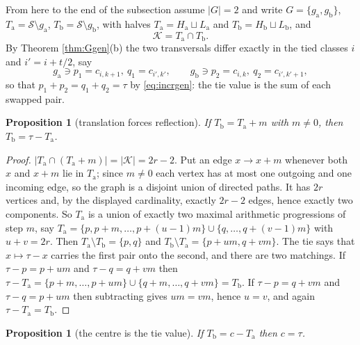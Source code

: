 \documentclass[11pt,reqno]{amsart}
\theoremstyle{plain}
\newtheorem{proposition}[theorem]{Proposition}
\theoremstyle{definition}
\begin{document}
From here to the end of the subsection assume $|G|=2$ and write $G=\{g_{\mathrm a},g_{\mathrm b}\}$,
$T_{\mathrm a}=\mathcal{S}\setminus g_{\mathrm a}$, $T_{\mathrm b}=\mathcal{S}\setminus g_{\mathrm b}$,
with halves $T_{\mathrm a}=H_{\mathrm a}\sqcup L_{\mathrm a}$ and
$T_{\mathrm b}=H_{\mathrm b}\sqcup L_{\mathrm b}$, and
\[
  \mathcal{K}=T_{\mathrm a}\cap T_{\mathrm b}.
\]
By Theorem \ref{thm:Ggen}(b) the two transversals differ exactly in the tied classes $i$ and
$i'=i+t/2$, say
\begin{equation}\label{eq:swapgen}
  g_{\mathrm a}\ni p_1=c_{i,k+1},\ q_1=c_{i',k'},\qquad
  g_{\mathrm b}\ni p_2=c_{i,k},\ q_2=c_{i',k'+1},
\end{equation}
so that $p_1+p_2=q_1+q_2=\tau$ by \eqref{eq:incrgen}: the tie value is the sum of each swapped pair.

\begin{proposition}[translation forces reflection]\label{prop:translgen}
If $T_{\mathrm b}=T_{\mathrm a}+m$ with $m\ne0$, then $T_{\mathrm b}=\tau-T_{\mathrm a}$.
\end{proposition}

\begin{proof}
$|T_{\mathrm a}\cap(T_{\mathrm a}+m)|=|\mathcal{K}|=2r-2$. Put an edge $x\to x+m$ whenever both $x$ and
$x+m$ lie in $T_{\mathrm a}$; since $m\ne0$ each vertex has at most one outgoing and one incoming
edge, so the graph is a disjoint union of directed paths. It has $2r$ vertices and, by the displayed
cardinality, exactly $2r-2$ edges, hence exactly two components. So $T_{\mathrm a}$ is a union of
exactly two maximal arithmetic progressions of step $m$, say
$T_{\mathrm a}=\{p,p+m,\dots,p+(u-1)m\}\cup\{q,\dots,q+(v-1)m\}$ with $u+v=2r$. Then
$T_{\mathrm a}\setminus T_{\mathrm b}=\{p,q\}$ and $T_{\mathrm b}\setminus T_{\mathrm a}=\{p+um,q+vm\}$.
The tie says that $x\mapsto\tau-x$ carries the first pair onto the second, and there are two
matchings. If $\tau-p=p+um$ and $\tau-q=q+vm$ then
$\tau-T_{\mathrm a}=\{p+m,\dots,p+um\}\cup\{q+m,\dots,q+vm\}=T_{\mathrm b}$. If $\tau-p=q+vm$ and
$\tau-q=p+um$ then subtracting gives $um=vm$, hence $u=v$, and again
$\tau-T_{\mathrm a}=T_{\mathrm b}$.
\end{proof}

\begin{proposition}[the centre is the tie value]\label{prop:centregen}
If $T_{\mathrm b}=c-T_{\mathrm a}$ then $c=\tau$.
\end{proposition}
\end{document}
